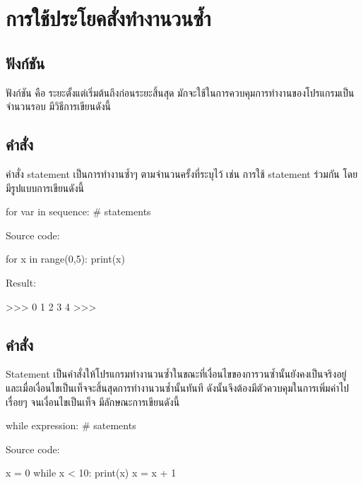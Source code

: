 \chapter{การใช้ประโยคสั่งทำงานวนซ้ำ}
\section{ฟังก์ชัน  }

ฟังก์ชัน   คือ ระยะตั้งแต่เริ่มต้นถึงก่อนระยะสิ้นสุด มักจะใช้ในการควบคุมการทำงานของโปรแกรมเป็นจำนวนรอบ มีวิธีการเขียนดังนี้  

\section{คำสั่ง  }

คำสั่ง   statement เป็นการทำงานซ้ำๆ ตามจำนวนครั้งที่ระบุไว้ เช่น การใช้   statement ร่วมกัน   โดยมีรูปแบบการเขียนดังนี้

\begin{codelist}{}{}
for var in sequence:
    # statements
\end{codelist}

Source code:
\begin{codelist}{}{}
for x in range(0,5): print(x)
\end{codelist}

Result:
\begin{codelist}{}{}
>>>
0
1
2
3
4
>>>
\end{codelist}

\section{คำสั่ง  }

  Statement เป็นคำสั่งให้โปรแกรมทำงานวนซ้ำในขณะที่เงื่อนไขของการวนซ้ำนั้นยังคงเป็นจริงอยู่ และเมื่อเงื่อนไขเป็นเท็จจะสิ้นสุดการทำงานวนซ้ำนั้นทันที ดังนั้นจึงต้องมีตัวควบคุมในการเพิ่มค่าไปเรื่อยๆ จนเงื่อนไขเป็นเท็จ มีลักษณะการเขียนดังนี้

\begin{codelist}{}{}
while expression:
    # satements
\end{codelist}

Source code:
\begin{codelist}{}{}
x = 0
while x < 10:
    print(x)
    x = x + 1
\end{codelist}

